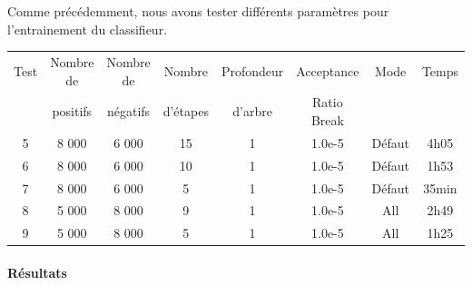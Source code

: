 \documentclass[11pt]{article}
\begin{document}
\noindent Comme précédemment, nous avons tester différents paramètres pour l'entrainement du classifieur. \bigbreak

\begin{center} 
    \begin{tabular}{|c|c|c|c|c|c|c|c|}
        \hline
        Test & Nombre de & Nombre de & Nombre & Profondeur & Acceptance  & Mode & Temps \\
        & positifs & négatifs & d'étapes & d'arbre & Ratio Break &  &  \\ 
        \hline 
        5 & 8 000 & 6 000 & 15 & 1 & 1.0e-5 & Défaut & 4h05 \\
        \hline
        6 & 8 000 & 6 000 & 10 & 1 & 1.0e-5 & Défaut & 1h53 \\
        \hline
        7 & 8 000 & 6 000 & 5 & 1 & 1.0e-5 & Défaut & 35min \\
        \hline
        8 & 5 000 & 8 000 & 9 & 1 & 1.0e-5 & All & 2h49 \\
        \hline
        9 & 5 000 & 8 000 & 5 & 1 & 1.0e-5 & All & 1h25 \\
        \hline
    \end{tabular}
\end{center}


\paragraph{Résultats}
\end{document}

